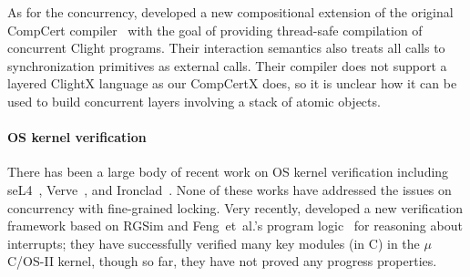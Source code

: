 As for the concurrency, \citet{stewart15} developed a new compositional extension of the
original CompCert compiler~\cite{compcert} with the goal of providing
thread-safe compilation of concurrent Clight programs.  Their
interaction semantics also treats all calls to synchronization
primitives as external calls. Their compiler does not support a layered
ClightX language as our CompCertX does, so it is unclear how it can
be used to build concurrent layers involving a stack of atomic objects.

%
% 
%
%
% 
%
%
%
\paragraph{OS kernel verification} There has been a large body
of recent work on OS kernel verification including
seL4~\cite{klein2009sel4,klein14}, Verve~\cite{hawblitzel10},
and Ironclad~\cite{ironclad14}. None of these works have addressed the
issues on concurrency with fine-grained locking. Very recently,
\citet{xu16} developed a new verification framework based on RGSim
and Feng~{et~al.}'s program logic~\cite{feng08:aim} for reasoning
about interrupts; they have successfully verified many key modules
(in C) in the $\mu$C/OS-II kernel, though so far, they have not proved
any progress properties.

